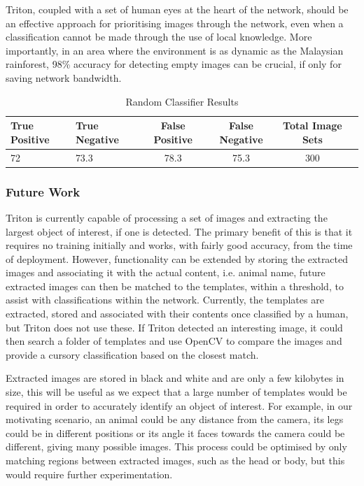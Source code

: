 		Triton, coupled with a set of human eyes at the heart of the network, should be an effective approach for prioritising images through the network, even when a classification cannot be made through the use of local knowledge. More importantly, in an area where the environment is as dynamic as the Malaysian rainforest, 98\% accuracy for detecting empty images can be crucial, if only for saving network bandwidth.
		
		\begin{footnotesize}
		\begin{table}
		\centering
			\hfill{}
			\begin{tabular}{|l|l|c|c|c|c|}
				\hline
					True Positive & True Negative & False Positive  & False Negative & Total Image Sets \\
				\hline
					72 & 73.3 & 78.3 & 75.3 & 300 \\
				\hline
			\end{tabular}
			\hfill{}
			\caption{Random Classifier Results}
			\label{table:random}
		\end{table}		
		\end{footnotesize}	
%	
	\subsubsection{Future Work}
		Triton is currently capable of processing a set of images and extracting the largest object of interest, if one is detected. The primary benefit of this is that it requires no training initially and works, with fairly good accuracy, from the time of deployment. However, functionality can be extended by storing the extracted images and associating it with the actual content, i.e. animal name, future extracted images can then be matched to the templates, within a threshold, to assist with classifications within the network. Currently, the templates are extracted, stored and associated with their contents once classified by a human, but Triton does not use these. If Triton detected an interesting image, it could then search a folder of templates and use OpenCV to compare the images and provide a cursory classification based on the closest match. 
		
		Extracted images are stored in black and white and are only a few kilobytes in size, this will be useful as we expect that a large number of templates would be required in order to accurately identify an object of interest. For example, in our motivating scenario, an animal could be any distance from the camera, its legs could be in different positions or its angle it faces towards the camera could be different, giving many possible images. This process could be optimised by only matching regions between extracted images, such as the head or body, but this would require further experimentation.


